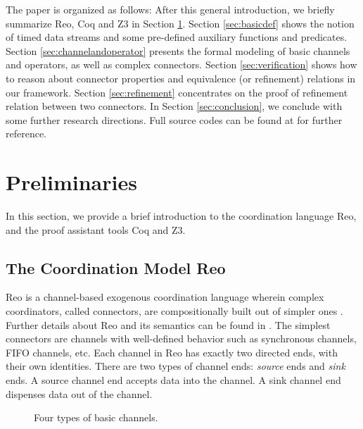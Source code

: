 \documentclass[preprint,3p]{elsarticle}
\begin{document}
The paper is organized as follows: After this general introduction, we briefly summarize Reo, Coq and Z3
in Section \ref{sec:pre}. Section \ref{sec:basicdef} shows the notion of timed data streams and some
pre-defined auxiliary functions and predicates. Section \ref{sec:channelandoperator} presents the
formal modeling of basic channels and operators, as well as complex connectors. Section
\ref{sec:verification} shows how to reason about connector properties and equivalence (or
refinement) relations in our framework. Section \ref{sec:refinement} concentrates on the proof of refinement relation between two connectors.
In Section \ref{sec:conclusion}, we conclude with some further research directions. Full source codes can be found at \cite{reo2coqfile} for further reference.

\section{Preliminaries}\label{sec:pre}

In this section, we provide a brief introduction to the coordination language Reo, and the proof assistant tools Coq and Z3.

\subsection{The Coordination Model Reo}
Reo is a channel-based exogenous coordination language wherein complex coordinators, called connectors,
are compositionally built out of simpler ones \cite{Arb04}.
Further details about Reo and its semantics can be found in \cite{Arb04, AR03, BSAR06}.
The simplest connectors are channels with well-defined behavior such as synchronous channels, FIFO channels, etc.
Each channel in Reo has exactly two directed ends, with their own identities.
There are two types of channel ends: \emph{source} ends and \emph{sink} ends. A source channel end accepts
data into the channel. A sink channel end dispenses data out of the channel.
\begin{figure}
  \centering
  \vspace{-6mm}
  \caption{Four types of basic channels.}\label{fig:basicchannel}
\end{figure}
\end{document}
